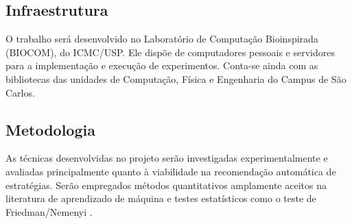 \subsection{Infraestrutura}
O trabalho será desenvolvido no Laboratório de Computação Bioinspirada (BIOCOM),
do ICMC/USP.
Ele dispõe de computadores pessoais e servidores para a implementação
e execução de experimentos.
Conta-se ainda com as bibliotecas
das unidades de Computação, Física e Engenharia do Campus de São Carlos.

\subsection{Metodologia}
As técnicas desenvolvidas no projeto serão investigadas
experimentalmente e avaliadas principalmente quanto à viabilidade na recomendação
automática de estratégias.
Serão empregados métodos quantitativos amplamente aceitos na literatura de aprendizado de máquina \citep{Bishop2006} e testes estatísticos
como o teste de Friedman/Nemenyi \citep{journals/jmlr/Demsar06}.



